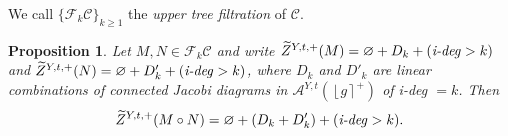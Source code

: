 \documentclass[10pt]{amsart}
\numberwithin{equation}{section}
\numberwithin{equation}{section}
\newtheorem{proposition}[theorem]{Proposition}
\theoremstyle{definition}
\begin{document}
We call $\{\mathcal{F}_k\mathcal{C}\}_{k\geq1}$ the \emph{upper tree filtration} of $\mathcal{C}$.

\begin{proposition}\label{homprop}  Let $M,N\in\mathcal{F}_k\mathcal{C}$ and write $\widetilde{Z}^{Y,t,+}(M)=\varnothing+D_k+ (\text{\emph{i-deg}}>k)$ and $\widetilde{Z}^{Y,t,+}(N)=\varnothing+D'_k+ (\text{\emph{i-deg}}>k)$, where $D_k$ and $D'_k$ are linear combinations of connected Jacobi diagrams in $\mathcal{A}^{Y,t}(\left\lfloor g\right\rceil^+)$ of \emph{i-deg} $=k$. Then 
\begin{equation}\label{ecuacion4.14}%
\widetilde{Z}^{Y,t,+}(M\circ N)=\varnothing+ (D_k+D'_k)+(\text{\emph{i-deg}}>k).
\end{equation}
\end{proposition}
\end{document}
